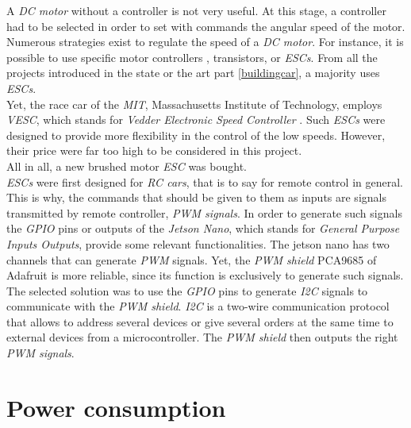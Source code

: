 		A \textit{DC motor} without a controller is not very useful. At this 
		stage, a controller had to be selected in order to set with commands
		the angular speed of the motor.
		Numerous strategies exist to regulate the speed of a \textit{DC motor}.
		For instance, it is possible to use specific motor controllers \cite{f1tenth}, 
		transistors, or \textit{ESCs}. From all the projects introduced
		in the state or the art part \vref{buildingcar}, a majority 
		uses \textit{ESCs}.
		\\\indent Yet, the race car of the \textit{MIT}, Massachusetts Institute
		of Technology, employs \textit{VESC}, which stands for \textit{Vedder 
		Electronic Speed Controller} \cite{mitracecar}. Such \textit{ESCs} were designed
		to provide more flexibility in the control of the low speeds. However, their price
		were far too high to be considered in this project.
		\\\indent All in all, a new brushed motor \textit{ESC} was bought.
		\\\indent \textit{ESCs} were first designed for \textit{RC cars}, that is to say for 
		remote control in general. This is why, the commands that should be given to them
		as inputs are signals transmitted by remote controller, \textit{PWM signals}. In order
		to generate such signals the \textit{GPIO}
		pins or outputs of the \textit{Jetson Nano}, which stands for \textit{General Purpose Inputs Outputs}, 
		provide some relevant functionalities. The jetson nano has two channels that
		can generate \textit{PWM} signals. Yet, the \textit{PWM shield}  PCA9685
		of Adafruit is more reliable, since its function is exclusively to generate
		such signals. The selected solution was to use the \textit{GPIO} pins 
		to generate \textit{I2C} signals to communicate
		with the \textit{PWM shield}. \textit{I2C} is 
		a two-wire communication 
		protocol that allows to address several devices or give several 
		orders at the same time to external devices from a microcontroller. The \textit{PWM shield}
		then outputs the right \textit{PWM signals}.\cite{tk1servo,nanogpio,nanogpiolayout} 
	
	\section{Power consumption}
		
